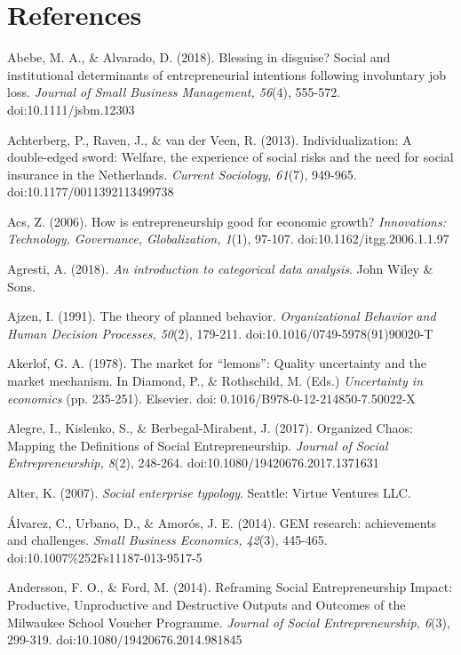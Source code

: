 \documentclass{article}
\begin{document}
\section{References}



Abebe, M. A., \& Alvarado, D. (2018). Blessing in disguise? Social and institutional determinants of entrepreneurial intentions following involuntary job loss. \emph{Journal of Small Business Management, 56}(4), 555-572. doi:10.1111/jsbm.12303

Achterberg, P., Raven, J., \& van der Veen, R. (2013). Individualization: A double-edged sword: Welfare, the experience of social risks and the need for social insurance in the Netherlands. \emph{Current Sociology, 61}(7), 949-965. doi:10.1177/0011392113499738

Acs, Z. (2006). How is entrepreneurship good for economic growth? \emph{Innovations: Technology, Governance, Globalization, 1}(1), 97-107. doi:10.1162/itgg.2006.1.1.97

Agresti, A. (2018). \emph{An introduction to categorical data analysis}. John Wiley \& Sons.

Ajzen, I. (1991). The theory of planned behavior. \emph{Organizational }\emph{Behavior}\emph{ and Human Decision Processes, 50}(2), 179-211. doi:10.1016/0749-5978(91)90020-T

Akerlof, G. A. (1978). The market for “lemons”: Quality uncertainty and the market mechanism. In Diamond, P., \& Rothschild, M. (Eds.) \emph{Uncertainty in economics }(pp. 235-251). Elsevier. doi: 0.1016/B978-0-12-214850-7.50022-X

Alegre, I., Kislenko, S., \& Berbegal-Mirabent, J. (2017). Organized Chaos: Mapping the Definitions of Social Entrepreneurship. \emph{Journal of Social Entrepreneurship, 8}(2), 248-264. doi:10.1080/19420676.2017.1371631

Alter, K. (2007). \emph{Social enterprise typology}. Seattle: Virtue Ventures LLC. 

Álvarez, C., Urbano, D., \& Amorós, J. E. (2014). GEM research: achievements and challenges. \emph{Small Business Economics, 42}(3), 445-465. doi:10.1007\%252Fs11187-013-9517-5

Andersson, F. O., \& Ford, M. (2014). Reframing Social Entrepreneurship Impact: Productive, Unproductive and Destructive Outputs and Outcomes of the Milwaukee School Voucher Programme. \emph{Journal of Social Entrepreneurship, 6}(3), 299-319. doi:10.1080/19420676.2014.981845
\end{document}
